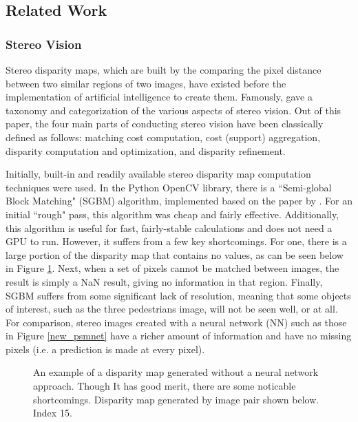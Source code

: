 \newpage
\subsection{Related Work} %

\subsubsection{Stereo Vision}
Stereo disparity maps, which are built by the comparing the pixel distance between two similar regions of two images, have existed before the implementation of artificial intelligence to create them. Famously, \cite{scharstein_taxonomy_2002} gave a taxonomy and categorization of the various aspects of stereo vision. Out of this paper, the four main parts of conducting stereo vision have been classically defined as follows: matching cost computation, cost (support) aggregation, disparity computation and optimization, and disparity refinement.

Initially, built-in and readily available stereo disparity map computation techniques were used. In the Python OpenCV library, there is a ``Semi-global Block Matching" (SGBM) algorithm, implemented based on the paper by \cite{hirschmuller_stereo_2007}. For an initial ``rough" pass, this algorithm was cheap and fairly effective. Additionally, this algorithm is useful for fast, fairly-stable calculations and does not need a GPU to run. However, it suffers from a few key shortcomings. For one, there is a large portion of the disparity map that contains no values, as can be seen below in Figure \ref{ind15_SGBM_comparison}. Next, when a set of pixels cannot be matched between images, the result is simply a NaN result, giving no information in that region. Finally, SGBM suffers from some significant lack of resolution, meaning that some objects of interest, such as the three pedestrians image, will not be seen well, or at all. For comparison, stereo images created with a neural network (NN) such as those in Figure \ref{new_psmnet} have a richer amount of information and have no missing pixels (i.e. a prediction is made at every pixel).

\begin{figure}[H]
    \centering
    \caption{An example of a disparity map generated without a neural network approach. Though It has good merit, there are some noticable shortcomings. Disparity map generated by image pair shown below. Index 15.}
    \label{ind15_SGBM_comparison}
\end{figure}

